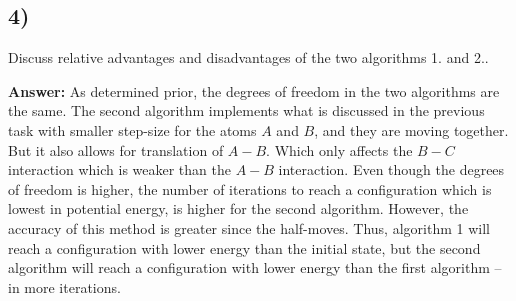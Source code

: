 \documentclass[a4paper]{article}
\newcommand{\newparagraph}{\vspace{.5cm}\noindent}
\begin{document}
\subsection*{4)}
Discuss relative advantages and disadvantages of the two algorithms {\color{red} 1.} and {\color{blue} 2.}.

\newparagraph
\textbf{Answer: }As determined prior, the degrees of freedom in the two algorithms are the same.
The second algorithm implements what is discussed in the previous task with smaller step-size for the atoms $A$ and $B$, and they are moving together. 
But it also allows for translation of $A-B$. Which only affects the $B-C$ interaction which is weaker than the $A-B$ interaction.
Even though the degrees of freedom is higher, the number of iterations to reach a configuration which is lowest in potential energy, is higher for the {\color{blue} second algorithm}. However, the accuracy of this method is greater since the half-moves.
Thus, {\color{red} algorithm 1} will reach a configuration with lower energy than the initial state, but the {\color{blue} second algorithm} will reach a configuration with lower energy than the {\color{red} first algorithm} -- in more iterations.
\end{document}
